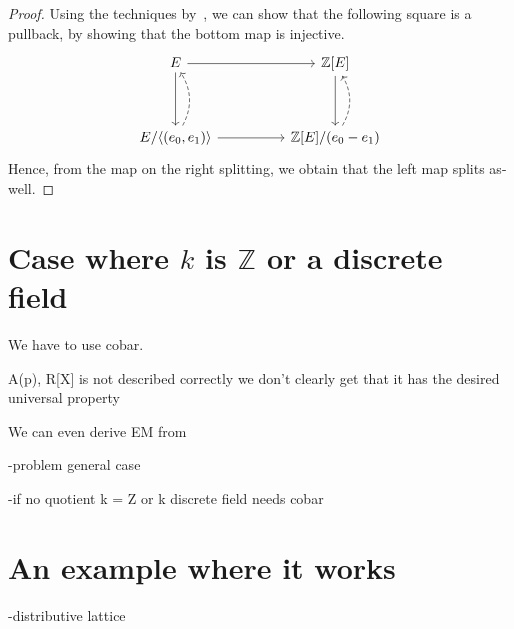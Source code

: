 \documentclass[10pt,a4paper]{article}
\newcommand{\ints}{\mathbb{Z}}
\DeclarePairedDelimiter\gen{\langle}{\rangle}
\begin{document}
\begin{proof}
  Using the techniques by~\cite{mines}, we can show that the following square is a pullback, by showing that the bottom map is injective.
  \[\begin{tikzcd}
    E \arrow[dd] \arrow[rr]                                        &  & {\ints[E]} \arrow[dd]                                 \\
                                                                  &  &                                                       \\
    {E/\gen{(e_0, e_1)}} \arrow[rr] \arrow[uu, dashed, bend right] &  & {\ints[E]/(e_0 - e_1)} \arrow[uu, dashed, bend right]
  \end{tikzcd}\]
  Hence, from the map on the right splitting, we obtain that the left map splits as-well.
\end{proof}

\section{Case where $k$ is $\ints$ or a discrete field}

 We have to use cobar. %


A(p), R[X] is not described correctly
we don't clearly get that it has the desired universal property

We can even derive EM from


-problem general case

-if no quotient k = Z or k discrete field needs cobar

\section{An example where it works}

-distributive lattice




\end{document}
